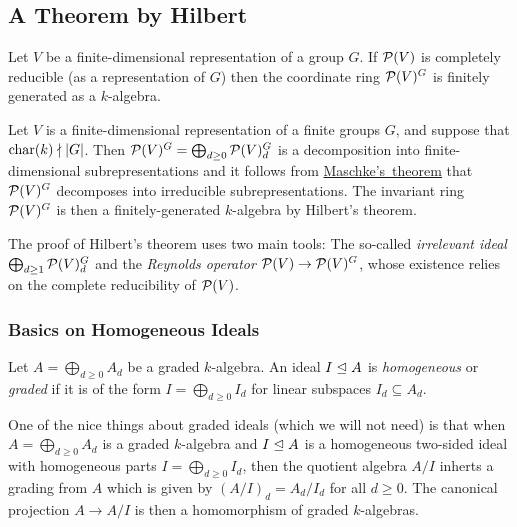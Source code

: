 \subsection{A Theorem by Hilbert}


\begin{theorem}[Hilbert]
  Let $V$ be a finite-dimensional representation of a group $G$.
  If $\mathcal{P}(V)$ is completely reducible (as a representation of $G$) then the coordinate ring $\mathcal{P}(V)^G$ is finitely generated as a $k$-algebra.
\end{theorem}


\begin{example}
  \label{example: invariant ring for finite groups finitely generated}
  Let $V$ is a finite-dimensional representation of a finite groups $G$, and suppose that $\operatorname{char}(k) \nmid |G|$.
  Then $\mathcal{P}(V)^G = \bigoplus_{d \geq 0} \mathcal{P}(V)^G_d$ is a decomposition into finite-dimensional subrepresentations and it follows from \hyperref[theorem: maschkes theorem]{Maschke’s~theorem} that $\mathcal{P}(V)^G$ decomposes into irreducible subrepresentations.
  The invariant ring $\mathcal{P}(V)^G$ is then a finitely-generated $k$-algebra by Hilbert’s theorem.
\end{example}


\begin{fluff}
  The proof of Hilbert's theorem uses two main tools:
  The so-called \emph{irrelevant ideal} $\bigoplus_{d \geq 1} \mathcal{P}(V)^G_d$ and the \emph{Reynolds operator} $\mathcal{P}(V) \to \mathcal{P}(V)^G$, whose existence relies on the complete reducibility of $\mathcal{P}(V)$.
\end{fluff}



\subsubsection{Basics on Homogeneous Ideals}


\begin{definition}
  Let $A = \bigoplus_{d \geq 0} A_d$ be a graded $k$-algebra.
  An ideal $I \trianglelefteq A$ is \emph{homogeneous} or \emph{graded} if it is of the form $I = \bigoplus_{d \geq 0} I_d$ for linear subspaces $I_d \subseteq A_d$.
\end{definition}


\begin{remark}
  \label{remark: quotient by homogeneous ideals are again graded}
  One of the nice things about graded ideals (which we will not need) is that when $A = \bigoplus_{d \geq 0} A_d$ is a graded $k$-algebra and $I \trianglelefteq A$ is a homogeneous two-sided ideal with homogeneous parts $I = \bigoplus_{d \geq 0} I_d$, then the quotient algebra $A/I$ inherts a grading from $A$ which is given by $(A/I)_d = A_d/I_d$ for all $d \geq 0$.
  The canonical projection $A \to A/I$ is then a homomorphism of graded $k$-algebras.
\end{remark}


